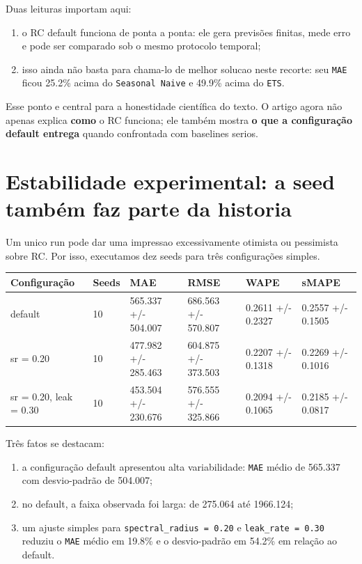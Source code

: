 \documentclass[12pt]{article}
\providecommand{\tightlist}{%
              \setlength{\itemsep}{0pt}\setlength{\parskip}{0pt}}
\begin{document}
Duas leituras importam aqui:

\begin{enumerate}
\def\labelenumi{\arabic{enumi}.}
\tightlist
\item
  o RC default funciona de ponta a ponta: ele gera previsões finitas, mede erro e pode ser comparado sob o mesmo protocolo temporal;
\item
  isso ainda não basta para chama-lo de melhor solucao neste recorte: seu \texttt{MAE} ficou 25.2\% acima do \texttt{Seasonal\ Naive} e 49.9\% acima do \texttt{ETS}.
\end{enumerate}

Esse ponto e central para a honestidade científica do texto. O artigo agora não apenas explica \textbf{como} o RC funciona; ele também mostra \textbf{o que a configuração default entrega} quando confrontada com baselines serios.

\section{Estabilidade experimental: a seed também faz parte da historia}\label{11-estabilidade-experimental-a-seed-tambuxe9m-faz-parte-da-historia}

Um unico run pode dar uma impressao excessivamente otimista ou pessimista sobre RC. Por isso, executamos dez seeds para três configurações simples.

\begin{longtable}[]{@{}llllll@{}}
\toprule\noalign{}
Configuração & Seeds & MAE & RMSE & WAPE & sMAPE \\
\midrule\noalign{}
\endhead
\bottomrule\noalign{}
\endlastfoot
default & 10 & 565.337 +/- 504.007 & 686.563 +/- 570.807 & 0.2611 +/- 0.2327 & 0.2557 +/- 0.1505 \\
sr = 0.20 & 10 & 477.982 +/- 285.463 & 604.875 +/- 373.503 & 0.2207 +/- 0.1318 & 0.2269 +/- 0.1016 \\
sr = 0.20, leak = 0.30 & 10 & 453.504 +/- 230.676 & 576.555 +/- 325.866 & 0.2094 +/- 0.1065 & 0.2185 +/- 0.0817 \\
\end{longtable}

Três fatos se destacam:

\begin{enumerate}
\def\labelenumi{\arabic{enumi}.}
\tightlist
\item
  a configuração default apresentou alta variabilidade: \texttt{MAE} médio de 565.337 com desvio-padrão de 504.007;
\item
  no default, a faixa observada foi larga: de 275.064 até 1966.124;
\item
  um ajuste simples para \texttt{spectral\_radius\ =\ 0.20} e \texttt{leak\_rate\ =\ 0.30} reduziu o \texttt{MAE} médio em 19.8\% e o desvio-padrão em 54.2\% em relação ao default.
\end{enumerate}
\end{document}
